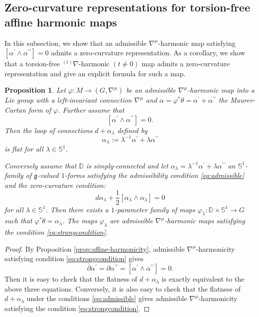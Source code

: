 \documentclass[12pt]{amsart}
\newtheorem{Proposition}[Theorem]{Proposition}
\theoremstyle{definition}
\theoremstyle{remark}
\numberwithin{equation}{section}
\begin{document}
\subsection{Zero-curvature representations for torsion-free affine 
 harmonic  maps}\label{subsc:strongly}
 In this subsection, we show that an admissible ${\nabla^{\mu}}$-harmonic 
 map satisfying
 $[\alpha^{\prime} \wedge \alpha^{\prime \prime}] =0$ 
 admits a zero-curvature representation. As a corollary, we show that 
 a torsion-free ${{}^{(t)} \nabla}$-harmonic $(t \neq 0)$ map
 admits a zero-curvature representation and give an explicit formula for such 
 a map.
\begin{Proposition}\label{prop:stronglyharmonicloop}
 Let $\varphi:M\to (G, {\nabla^{\mu}})$ be an admissible 
 ${\nabla^{\mu}}$-harmonic map into a Lie group with
  a left-invariant connection $\nabla^\mu$ and 
 $\alpha = \varphi^{*}\theta  = \alpha^{\prime} + 
 \alpha^{\prime \prime}$ the Maurer-Cartan form of $\varphi$.
 Further assume that 
 \begin{equation}\label{eq:strongcondition}
 [\alpha^{\prime} \wedge \alpha^{\prime \prime}] =0.
 \end{equation}
 Then the loop of connections $d+\alpha_{\lambda}$ defined by
\begin{equation}\label{eq:alpha-familystrong}
 \alpha_{\lambda}:= \lambda^{-1}\alpha^{\prime} 
 +\lambda \alpha^{\prime\prime}
\end{equation}
 is flat for all $\lambda \in \mathbb S^1$. 

 Conversely assume that  $\mathbb{D}$ is simply-connected and 
 let $\alpha_{\lambda}= \lambda^{-1}\alpha^{\prime}+ \lambda
 \alpha^{\prime \prime}$ an $\mathbb{S}^1$-family of 
 $\mathfrak{g}$-valued $1$-forms satisfying the admissibility 
 condition \eqref{eq:admissible}
 and the zero-curvature condition{\rm:}
\begin{equation*}
 d\alpha_{\lambda}+\frac{1}{2}[\alpha_\lambda\wedge \alpha_\lambda]=0
\end{equation*}
 for all $\lambda \in \mathbb{S}^1$.
 Then there exists a $1$-parameter family of maps $\varphi_\lambda:
 \mathbb{D}\times \mathbb{S}^1\to G$
 such that  $\varphi^{*}\theta= \alpha_{\lambda}$. 
 The maps $\varphi_{\lambda}$ are admissible 
 ${\nabla^{\mu}}$-harmonic maps satisfying the condition \eqref{eq:strongcondition}.
\end{Proposition}
\begin{proof}
 By Proposition \ref{prop:affine-harmonicity},
 admissible ${\nabla^{\mu}}$-harmonicity satisfying 
 condition \eqref{eq:strongcondition}
 gives
\begin{equation*}
 \bar \partial \alpha^{\prime} =
 \partial \alpha^{\prime \prime} = [\alpha^{\prime} \wedge 
 \alpha^{\prime \prime}] =0.
\end{equation*}
 Then it is easy to check that the flatness of $d + \alpha_{\lambda}$
 is exactly equivalent to the above three equations. 
 Conversely, it is also easy to check that the flatness of $d + \alpha_{\lambda}$ under 
 the conditions \eqref{eq:admissible} 
 gives admissible ${\nabla^{\mu}}$-harmonicity satisfying the condition
 \eqref{eq:strongcondition}.
\end{proof}
\end{document}
